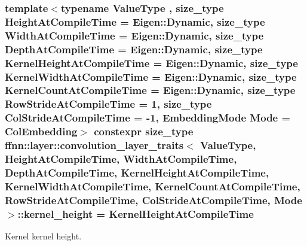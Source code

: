 \hypertarget{structffnn_1_1layer_1_1convolution__layer__traits_ad6fb939fee90c196d31a8c98f663caa3}{
\subsubsection[{kernel\-\_\-height}]{\setlength{\rightskip}{0pt plus 5cm}template$<$typename Value\-Type , size\-\_\-type Height\-At\-Compile\-Time = Eigen\-::\-Dynamic, size\-\_\-type Width\-At\-Compile\-Time = Eigen\-::\-Dynamic, size\-\_\-type Depth\-At\-Compile\-Time = Eigen\-::\-Dynamic, size\-\_\-type Kernel\-Height\-At\-Compile\-Time = Eigen\-::\-Dynamic, size\-\_\-type Kernel\-Width\-At\-Compile\-Time = Eigen\-::\-Dynamic, size\-\_\-type Kernel\-Count\-At\-Compile\-Time = Eigen\-::\-Dynamic, size\-\_\-type Row\-Stride\-At\-Compile\-Time = 1, size\-\_\-type Col\-Stride\-At\-Compile\-Time = -\/1, Embedding\-Mode Mode = Col\-Embedding$>$ constexpr {\bf size\-\_\-type} {\bf ffnn\-::layer\-::convolution\-\_\-layer\-\_\-traits}$<$ Value\-Type, Height\-At\-Compile\-Time, Width\-At\-Compile\-Time, Depth\-At\-Compile\-Time, Kernel\-Height\-At\-Compile\-Time, Kernel\-Width\-At\-Compile\-Time, Kernel\-Count\-At\-Compile\-Time, Row\-Stride\-At\-Compile\-Time, Col\-Stride\-At\-Compile\-Time, Mode $>$\-::kernel\-\_\-height = Kernel\-Height\-At\-Compile\-Time\hspace{0.3cm}{\ttfamily [static]}}}\label{structffnn_1_1layer_1_1convolution__layer__traits_ad6fb939fee90c196d31a8c98f663caa3}


Kernel kernel height. 

